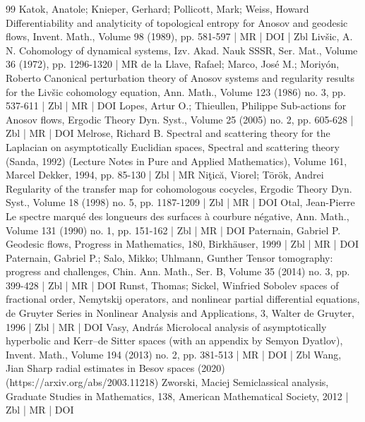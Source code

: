 \documentclass[10pt]{amsart}
\theoremstyle{definition}\newtheorem{defi}[theo]{Definition}\newtheorem{rema}[theo]{Remark}\newtheorem{exam}[theo]{Example}\newtheorem{exem}[theo]{Example}\newtheorem{nota}[theo]{Notation}
\begin{document}
\begin{thebibliography}{99}
Katok, Anatole; Knieper, Gerhard; Pollicott, Mark; Weiss, Howard Differentiability and analyticity of topological entropy for Anosov and geodesic flows, Invent. Math., Volume 98 (1989), pp. 581-597 | MR | DOI | Zbl
Livšic, A. N. Cohomology of dynamical systems, Izv. Akad. Nauk SSSR, Ser. Mat., Volume 36 (1972), pp. 1296-1320 | MR
de la Llave, Rafael; Marco, José M.; Moriyón, Roberto Canonical perturbation theory of Anosov systems and regularity results for the Livšic cohomology equation, Ann. Math., Volume 123 (1986) no. 3, pp. 537-611 | Zbl | MR | DOI
Lopes, Artur O.; Thieullen, Philippe Sub-actions for Anosov flows, Ergodic Theory Dyn. Syst., Volume 25 (2005) no. 2, pp. 605-628 | Zbl | MR | DOI
Melrose, Richard B. Spectral and scattering theory for the Laplacian on asymptotically Euclidian spaces, Spectral and scattering theory (Sanda, 1992) (Lecture Notes in Pure and Applied Mathematics), Volume 161, Marcel Dekker, 1994, pp. 85-130 | Zbl | MR
Niţică, Viorel; Török, Andrei Regularity of the transfer map for cohomologous cocycles, Ergodic Theory Dyn. Syst., Volume 18 (1998) no. 5, pp. 1187-1209 | Zbl | MR | DOI
Otal, Jean-Pierre Le spectre marqué des longueurs des surfaces à courbure négative, Ann. Math., Volume 131 (1990) no. 1, pp. 151-162 | Zbl | MR | DOI
Paternain, Gabriel P. Geodesic flows, Progress in Mathematics, 180, Birkhäuser, 1999 | Zbl | MR | DOI
Paternain, Gabriel P.; Salo, Mikko; Uhlmann, Gunther Tensor tomography: progress and challenges, Chin. Ann. Math., Ser. B, Volume 35 (2014) no. 3, pp. 399-428 | Zbl | MR | DOI
Runst, Thomas; Sickel, Winfried Sobolev spaces of fractional order, Nemytskij operators, and nonlinear partial differential equations, de Gruyter Series in Nonlinear Analysis and Applications, 3, Walter de Gruyter, 1996 | Zbl | MR | DOI
Vasy, András Microlocal analysis of asymptotically hyperbolic and Kerr–de Sitter spaces (with an appendix by Semyon Dyatlov), Invent. Math., Volume 194 (2013) no. 2, pp. 381-513 | MR | DOI | Zbl
Wang, Jian Sharp radial estimates in Besov spaces (2020) (https://arxiv.org/abs/2003.11218)
Zworski, Maciej Semiclassical analysis, Graduate Studies in Mathematics, 138, American Mathematical Society, 2012 | Zbl | MR | DOI
\end{thebibliography}
\end{document}
